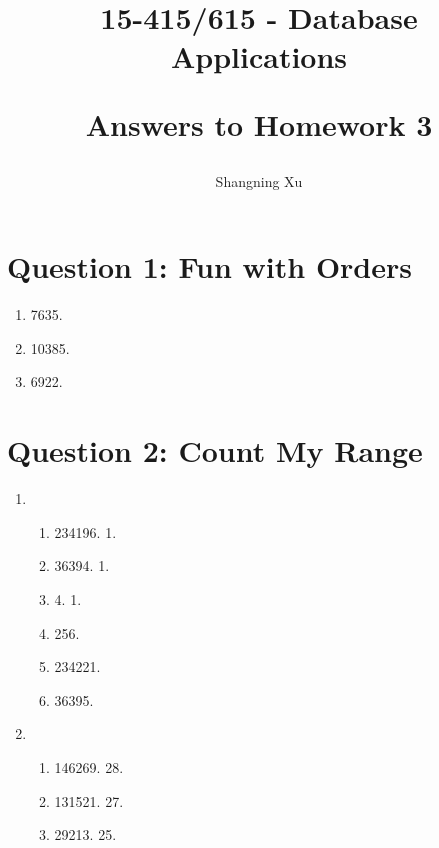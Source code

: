 \documentclass{article}
\title{
    15-415/615 - Database Applications

    Answers to Homework 3
}
\author{Shangning Xu}
\begin{document}
\maketitle
\newpage

\section*{Question 1: Fun with Orders}

\begin{enumerate}
    \item 7635.
    \item 10385.
    \item 6922.
\end{enumerate}

\newpage

\section*{Question 2: Count My Range}

\begin{enumerate}
    \item \begin{enumerate}[start=2]
        \item 234196. 1.
        \item 36394. 1.
        \item 4. 1.
        \item 256.
        \item 234221.
        \item 36395.
    \end{enumerate}

    \item \begin{enumerate}
        \item 146269. 28.
        \item 131521. 27.
        \item 29213. 25.
    \end{enumerate}
\end{enumerate}
\end{document}
